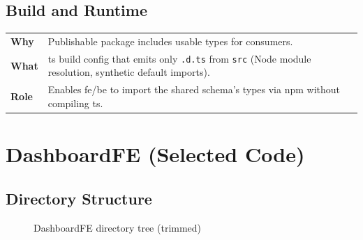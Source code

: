 \documentclass[11pt, a4paper, oneside, listof=totoc]{scrartcl}
\makeatletter
\newcommand{\codesummary}[3]{%
    \vspace{0.4\baselineskip}%
    \noindent\begin{tabularx}{\linewidth}{@{}>{\bfseries}l X@{}}
    Why  & #1\\
    What & #2\\
    Role & #3\\
    \end{tabularx}%
    \vspace{0.2\baselineskip}%
}
\makeatother
\begin{document}
            \subsection{Build and Runtime}
                \codesummary
                    {Publishable package includes usable types for consumers.}
                    {\gls{ts} build config that emits only \texttt{.d.ts} from \texttt{src} (Node module resolution, synthetic default imports).}
                    {Enables \gls{fe}/\gls{be} to import the shared schema’s types via \gls{npm} without compiling \gls{ts}.}

        \clearpage

        \section{DashboardFE (Selected Code)}\label{app:dashboardfe}

            \subsection{Directory Structure}
                \begin{figure}[H]
                    \centering
                    \caption{DashboardFE directory tree (trimmed)}\label{fig:dashboardfe-tree}
                \end{figure}

        \clearpage
\end{document}
